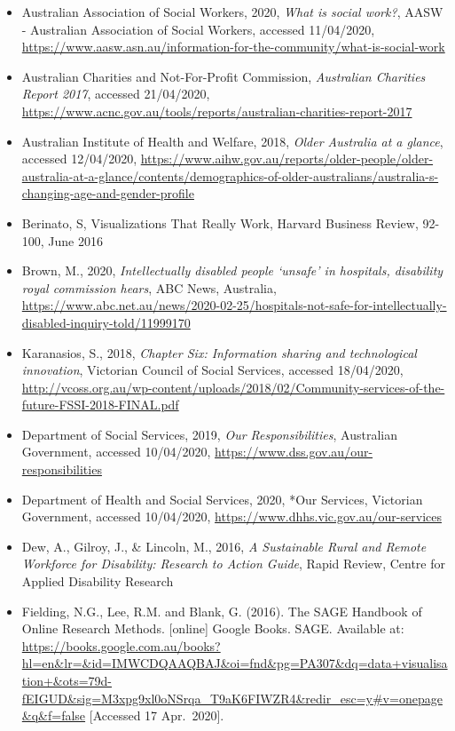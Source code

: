 \documentclass[
  11pt,
]{article}
\begin{document}
\begin{itemize}
\item
  Australian Association of Social Workers, 2020, \emph{What is social work?}, AASW - Australian Association of Social Workers, accessed 11/04/2020, \url{https://www.aasw.asn.au/information-for-the-community/what-is-social-work}
\item
  Australian Charities and Not-For-Profit Commission, \emph{Australian Charities Report 2017}, accessed 21/04/2020, \url{https://www.acnc.gov.au/tools/reports/australian-charities-report-2017}
\item
  Australian Institute of Health and Welfare, 2018, \emph{Older Australia at a glance}, accessed 12/04/2020, \url{https://www.aihw.gov.au/reports/older-people/older-australia-at-a-glance/contents/demographics-of-older-australians/australia-s-changing-age-and-gender-profile}
\item
  Berinato, S, Visualizations That Really Work, Harvard Business Review, 92-100, June 2016
\item
  Brown, M., 2020, \emph{Intellectually disabled people `unsafe' in hospitals, disability royal commission hears}, ABC News, Australia, \url{https://www.abc.net.au/news/2020-02-25/hospitals-not-safe-for-intellectually-disabled-inquiry-told/11999170}
\item
  Karanasios, S., 2018, \emph{Chapter Six: Information sharing and technological innovation}, Victorian Council of Social Services, accessed 18/04/2020, \url{http://vcoss.org.au/wp-content/uploads/2018/02/Community-services-of-the-future-FSSI-2018-FINAL.pdf}
\item
  Department of Social Services, 2019, \emph{Our Responsibilities}, Australian Government, accessed 10/04/2020, \url{https://www.dss.gov.au/our-responsibilities}
\item
  Department of Health and Social Services, 2020, *Our Services, Victorian Government, accessed 10/04/2020, \url{https://www.dhhs.vic.gov.au/our-services}
\item
  Dew, A., Gilroy, J., \& Lincoln, M., 2016, \emph{A Sustainable Rural and Remote Workforce for Disability: Research to Action Guide}, Rapid Review, Centre for Applied Disability Research
\item
  Fielding, N.G., Lee, R.M. and Blank, G. (2016). The SAGE Handbook of Online Research Methods. {[}online{]} Google Books. SAGE. Available at: \url{https://books.google.com.au/books?hl=en\&lr=\&id=IMWCDQAAQBAJ\&oi=fnd\&pg=PA307\&dq=data+visualisation+\&ots=79d-fEIGUD\&sig=M3xpg9xl0oNSrqa_T9aK6FIWZR4\&redir_esc=y\#v=onepage\&q\&f=false} {[}Accessed 17 Apr.~2020{]}.

\end{itemize}
\end{document}
